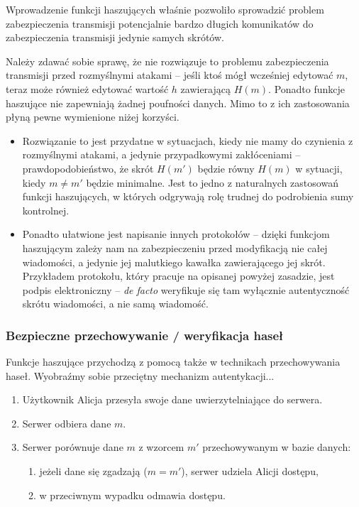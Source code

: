 \documentclass[12pt,a4paper,twoside]{article}
\begin{document}
Wprowadzenie funkcji haszujących właśnie pozwoliło sprowadzić problem
zabezpieczenia transmisji potencjalnie bardzo długich komunikatów do
zabezpieczenia transmisji jedynie samych skrótów.

Należy zdawać sobie sprawę, że nie rozwiązuje to problemu zabezpieczenia
transmisji przed rozmyślnymi atakami -- jeśli ktoś mógł wcześniej edytować $m$,
teraz może również edytować wartość $h$ zawierającą $H(m)$. Ponadto funkcje
haszujące nie zapewniają żadnej poufności danych. Mimo to z ich zastosowania
płyną pewne wymienione niżej korzyści.

\begin{itemize}
\item Rozwiązanie to jest przydatne w sytuacjach, kiedy nie mamy do czynienia z
rozmyślnymi atakami, a jedynie przypadkowymi zakłóceniami --
prawdopodobieństwo, że skrót $H(m')$ będzie równy $H(m)$ w sytuacji, kiedy $m
\neq m'$ będzie minimalne. Jest to jedno z naturalnych zastosowań funkcji
haszujących, w których odgrywają rolę trudnej do podrobienia sumy kontrolnej.
\item Ponadto ułatwione jest napisanie innych protokołów -- dzięki funkcjom
haszującym zależy nam na zabezpieczeniu przed modyfikacją nie całej wiadomości,
a jedynie jej malutkiego kawałka zawierającego jej skrót. Przykładem protokołu,
który pracuje na opisanej powyżej zasadzie, jest podpis elektroniczny --
\emph{de facto} weryfikuje się tam wyłącznie autentyczność skrótu wiadomości, a
nie samą wiadomość.
\end{itemize}

\subsubsection{Bezpieczne przechowywanie / weryfikacja haseł}
\label{sec:usage_password_check}
Funkcje haszujące przychodzą z pomocą także w technikach przechowywania haseł.
Wyobraźmy sobie przeciętny mechanizm autentykacji...

\begin{enumerate}
\item Użytkownik Alicja przesyła swoje dane uwierzytelniające do serwera.
\item Serwer odbiera dane $m$.
\item Serwer porównuje dane $m$ z wzorcem $m'$ przechowywanym w bazie danych:
\label{enu:server_pass_check}
    \begin{enumerate}[label*=\arabic*.]
    \item jeżeli dane się zgadzają ($m = m'$), serwer udziela Alicji dostępu,
    \item w przeciwnym wypadku odmawia dostępu.
    \end{enumerate}
\end{enumerate}
\end{document}
